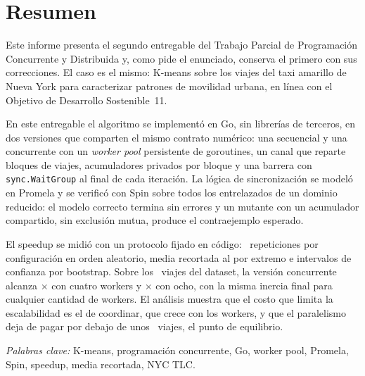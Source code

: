 \section*{Resumen}

Este informe presenta el segundo entregable del Trabajo Parcial de Programación Concurrente y
Distribuida y, como pide el enunciado, conserva el primero con sus correcciones. El caso es el
mismo: K-means sobre los viajes del taxi amarillo de Nueva York \parencite{nyctlc} para
caracterizar patrones de movilidad urbana, en línea con el Objetivo de Desarrollo Sostenible~11.

En este entregable el algoritmo se implementó en Go, sin librerías de terceros, en dos versiones
que comparten el mismo contrato numérico: una secuencial y una concurrente con un \emph{worker pool}
persistente de goroutines, un canal que reparte bloques de viajes, acumuladores privados por bloque
y una barrera con \texttt{sync.WaitGroup} al final de cada iteración. La lógica de sincronización se
modeló en Promela y se verificó con Spin sobre todos los entrelazados de un dominio reducido: el
modelo correcto termina sin errores y un mutante con un acumulador compartido, sin exclusión mutua,
produce el contraejemplo esperado.

El speedup se midió con un protocolo fijado en código: ~repeticiones por
configuración en orden aleatorio, media recortada al  por extremo e intervalos de
confianza por bootstrap. Sobre los ~viajes del dataset, la versión concurrente alcanza
$\times$ con cuatro workers y $\times$ con ocho, con la misma
inercia final para cualquier cantidad de workers. El análisis muestra que el costo que limita la
escalabilidad es el de coordinar, que crece con los workers, y que el paralelismo deja de pagar por
debajo de unos ~viajes, el punto de equilibrio.

\textit{Palabras clave:} K-means, programación concurrente, Go, worker pool, Promela, Spin, speedup,
media recortada, NYC TLC.
